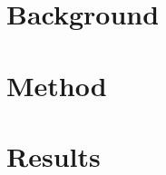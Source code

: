 \documentclass[a4paper,11pt]{article}
\begin{document}
\section{Background}

\section{Method}

\section{Results}
\end{document}
